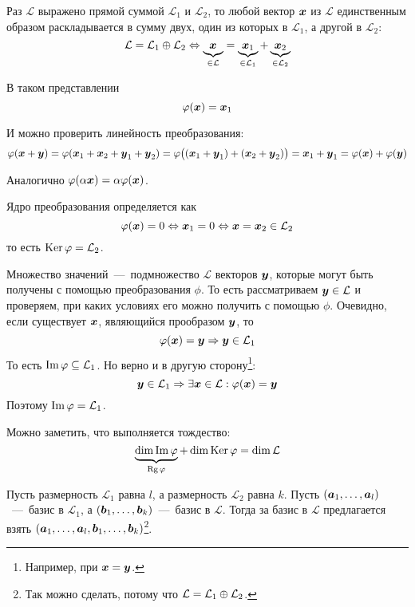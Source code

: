 \documentclass[a4paper,12pt]{article}
\DeclareMathOperator{\Image}{Im}
\begin{document}
  \begin{solution}
    Раз $\mathcal L$ выражено прямой суммой $\mathcal L_1$ и $\mathcal L_2$, то любой вектор $\boldsymbol x$ из $\mathcal L$ единственным образом раскладывается в сумму двух, один из которых в $\mathcal L_1$, а другой в $\mathcal L_2$:
    \[
      \mathcal L = \mathcal L_1 \oplus \mathcal L_2
      \Leftrightarrow \underbrace{\boldsymbol x_{\vphantom{1}}}_{\in \mathcal L} = \underbrace{\boldsymbol x_1}_{\in \mathcal L_1} + \underbrace{\boldsymbol x_2}_{\in \mathcal L_2} 
    \]  %
    
    В таком представлении
    \[
      \varphi(\boldsymbol x) = \boldsymbol x_1
    \]
    
    И можно проверить линейность преобразования:
    \[
      \varphi(\boldsymbol x + \boldsymbol y) = \varphi(\boldsymbol x_1 + \boldsymbol x_2 + \boldsymbol y_1 + \boldsymbol y_2)
      = \varphi\bigl((\boldsymbol x_1 + \boldsymbol y_1) + (\boldsymbol x_2 + \boldsymbol y_2)\bigr)
      = \boldsymbol x_1 + \boldsymbol y_1 = \varphi(\boldsymbol x) + \varphi(\boldsymbol y)
    \]
    
    Аналогично $\phi(\alpha \bds x) \hm= \alpha \phi(\bds x)$.
    
    Ядро преобразования определяется как
    \[
      \varphi(\boldsymbol x) = 0 \Leftrightarrow \boldsymbol x_1 = 0 \Leftrightarrow \boldsymbol x = \boldsymbol x_2 \in \mathcal L_2
    \]
    то есть $\Ker\phi \hm= \mathcal L_2$.
    
    Множество значений~---~подмножество $\mathcal L$ векторов $\boldsymbol y$, которые могут быть получены с помощью преобразования $\phi$.
    То есть рассматриваем $\bds y \hm\in \mathcal L$ и проверяем, при каких условиях его можно получить с помощью $\phi$.
    Очевидно, если существует $\boldsymbol x$, являющийся прообразом $\boldsymbol y$, то
    \[
      \varphi(\boldsymbol x) = \boldsymbol y \Rightarrow \boldsymbol y \in \mathcal L_1
    \]
    То есть $\Image\phi \hm{\subseteq} \mathcal L_1$.
    Но верно и в другую сторону\footnote{Например, при $\bds x \hm= \bds y$.}:
    \[
      \boldsymbol y \in \mathcal L_1 \Rightarrow \exists \boldsymbol x \in \mathcal L: \varphi(\boldsymbol x) = \boldsymbol y
    \]
    Поэтому $\Image\phi \hm= \mathcal L_1$.
    
    Можно заметить, что выполняется тождество:
    \[
      \underbrace{\dim\Image\phi}_{\Rg\phi} + \dim\Ker\phi = \dim\mathcal L
    \]
    
    \bigskip
    
    Пусть размерность $\mathcal L_1$ равна $l$, а размерность $\mathcal L_2$ равна $k$.
    Пусть $(\boldsymbol a_1, \ldots, \boldsymbol a_l)$~---~базис в $\mathcal L_1$, а $(\boldsymbol b_1, \ldots, \boldsymbol b_k)$~---~базис в $\mathcal L$.
    Тогда за базис в $\mathcal L$ предлагается взять $(\boldsymbol a_1, \ldots, \boldsymbol a_l, \boldsymbol b_1, \ldots, \boldsymbol b_k)$\footnote{Так можно сделать, потому что $\mathcal L \hm= \mathcal L_1 \hm\oplus \mathcal L_2$.}.
    

\end{solution}
\end{document}
